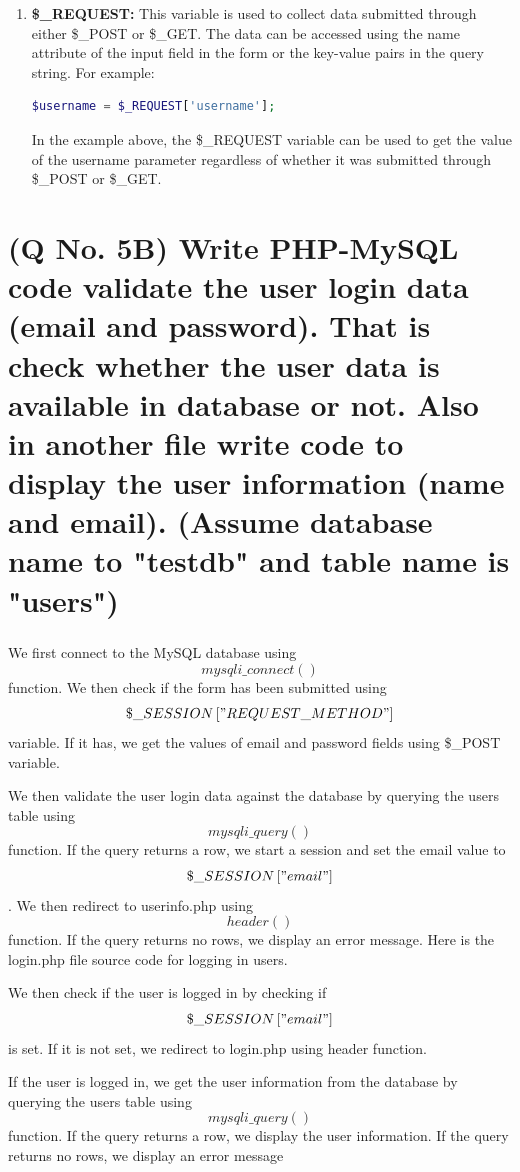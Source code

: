 \documentclass[11pt]{article}
\begin{document}
\begin{enumerate}
    \item \textbf{\$\_REQUEST:} This variable is used to collect data submitted through either \$\_POST or \$\_GET. The data can be accessed using the name attribute of the input field in the form or the key-value pairs in the query string. For example:
    \begin{lstlisting}[language=php, caption={process.php}]
        $username = $_REQUEST['username'];
    \end{lstlisting}

    In the example above, the \$\_REQUEST variable can be used to get the value of the username parameter regardless of whether it was submitted through \$\_POST or \$\_GET.

  \end{enumerate}

\section{(Q No. 5B) Write PHP-MySQL code validate the user login data (email and password). That is check whether the user data is available in database or not. Also in another file write code to display the user information (name and email). (Assume database name to "testdb" and table name is "users")}
\subparagraph{}
We first connect to the MySQL database using \[ mysqli\_connect\left(\right) \] function. We then check if the form has been submitted using \[ \$\_SESSION\left[ "REQUEST\_METHOD" \right] \] variable. If it has, we get the values of email and password fields using \$\_POST variable.

We then validate the user login data against the database by querying the users table using \[ mysqli\_query\left(\right) \] function. If the query returns a row, we start a session and set the email value to \[ \$\_SESSION\left[ "email" \right] \]. We then redirect to userinfo.php using \[header()\] function. If the query returns no rows, we display an error message.
Here is the login.php file source code for logging in users.


We then check if the user is logged in by checking if \[ \$\_SESSION\left[ "email" \right] \]  is set. If it is not set, we redirect to login.php using header function.

If the user is logged in, we get the user information from the database by querying the users table using \[ mysqli\_query\left(\right) \] function. If the query returns a row, we display the user information. If the query returns no rows, we display an error message
\end{document}
